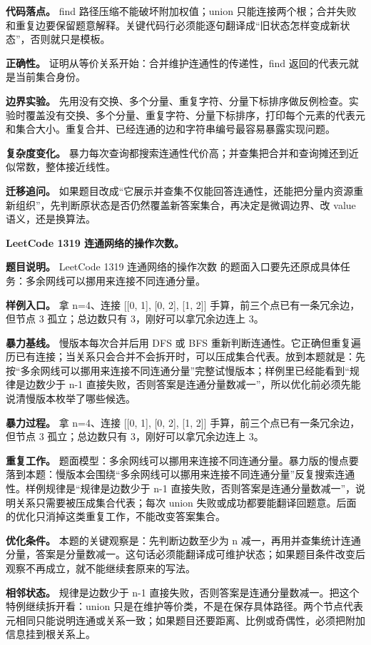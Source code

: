 \textbf{代码落点。} find 路径压缩不能破坏附加权值；union 只能连接两个根；合并失败和重复边要保留题意解释。关键代码行必须能逐句翻译成“旧状态怎样变成新状态”，否则就只是模板。

\textbf{正确性。} 证明从等价关系开始：合并维护连通性的传递性，find 返回的代表元就是当前集合身份。

\textbf{边界实验。} 先用没有交换、多个分量、重复字符、分量下标排序做反例检查。实验时覆盖没有交换、多个分量、重复字符、分量下标排序，打印每个元素的代表元和集合大小。重复合并、已经连通的边和字符串编号最容易暴露实现问题。

\textbf{复杂度变化。} 暴力每次查询都搜索连通性代价高；并查集把合并和查询摊还到近似常数，整体接近线性。

\textbf{迁移追问。} 如果题目改成“它展示并查集不仅能回答连通性，还能把分量内资源重新组织”，先判断原状态是否仍然覆盖新答案集合，再决定是微调边界、改 value 语义，还是换算法。

\noindent\textbf{LeetCode 1319 连通网络的操作次数。}

\textbf{题目说明。} LeetCode 1319 连通网络的操作次数 的题面入口要先还原成具体任务：多余网线可以挪用来连接不同连通分量。

\textbf{样例入口。} 拿 n=4、连接 [[0, 1], [0, 2], [1, 2]] 手算，前三个点已有一条冗余边，但节点 3 孤立；总边数只有 3，刚好可以拿冗余边连上 3。

\textbf{暴力基线。} 慢版本每次合并后用 DFS 或 BFS 重新判断连通性。它正确但重复遍历已有连接；当关系只会合并不会拆开时，可以压成集合代表。放到本题就是：先按“多余网线可以挪用来连接不同连通分量”完整试慢版本；样例里已经能看到“规律是边数少于 n-1 直接失败，否则答案是连通分量数减一”，所以优化前必须先能说清慢版本枚举了哪些候选。

\textbf{暴力过程。} 拿 n=4、连接 [[0, 1], [0, 2], [1, 2]] 手算，前三个点已有一条冗余边，但节点 3 孤立；总边数只有 3，刚好可以拿冗余边连上 3。

\textbf{重复工作。} 题面模型：多余网线可以挪用来连接不同连通分量。暴力版的慢点要落到本题：慢版本会围绕“多余网线可以挪用来连接不同连通分量”反复搜索连通性。样例规律是“规律是边数少于 n-1 直接失败，否则答案是连通分量数减一”，说明关系只需要被压成集合代表；每次 union 失败或成功都要能翻译回题意。后面的优化只消掉这类重复工作，不能改变答案集合。

\textbf{优化条件。} 本题的关键观察是：先判断边数至少为 n 减一，再用并查集统计连通分量，答案是分量数减一。这句话必须能翻译成可维护状态；如果题目条件改变后观察不再成立，就不能继续套原来的写法。

\textbf{相邻状态。} 规律是边数少于 n-1 直接失败，否则答案是连通分量数减一。把这个特例继续拆开看：union 只是在维护等价类，不是在保存具体路径。两个节点代表元相同只能说明连通或关系一致；如果题目还要距离、比例或奇偶性，必须把附加信息挂到根关系上。

